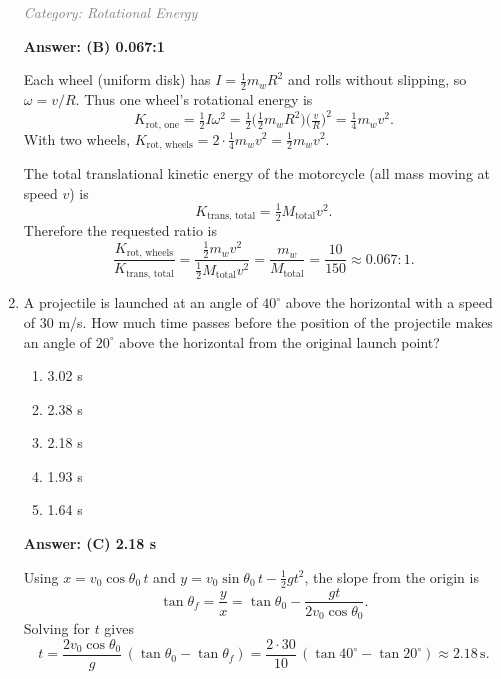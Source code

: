 ﻿\documentclass[12pt, a4paper]{article}
\makeatletter
\newif\if@categoryprinted
\newcommand{\category}[1]{\if@categoryprinted\relax\else\textit{\textcolor{gray}{Category: #1}}\global\@categoryprintedtrue\fi}
\makeatother
\begin{document}
\begin{CJK*}{UTF8}{gbsn}
\begin{enumerate}[itemsep=1.0em, topsep=0.6em]
\category{Rotational Energy}
\begin{solutionbox}
\textbf{Answer: (B) 0.067:1}

Each wheel (uniform disk) has $I=\tfrac{1}{2}m_w R^2$ and rolls without slipping, so $\omega=v/R$. Thus one wheel's rotational energy is
\[
K_{\text{rot, one}}=\tfrac{1}{2}I\omega^2=\tfrac{1}{2}\Big(\tfrac{1}{2}m_w R^2\Big)\Big(\tfrac{v}{R}\Big)^2=\tfrac{1}{4}m_w v^2.
\]
With two wheels, $K_{\text{rot, wheels}}=2\cdot\tfrac{1}{4}m_w v^2=\tfrac{1}{2}m_w v^2$.

The total translational kinetic energy of the motorcycle (all mass moving at speed $v$) is
\[
K_{\text{trans, total}}=\tfrac{1}{2}M_{\text{total}}v^2.
\]
Therefore the requested ratio is
\[
\frac{K_{\text{rot, wheels}}}{K_{\text{trans, total}}}=\frac{\tfrac{1}{2}m_w v^2}{\tfrac{1}{2}M_{\text{total}}v^2}=\frac{m_w}{M_{\text{total}}}=\frac{10}{150}\approx0.067:1.
\]
\end{solutionbox}

\newpage

\item \label{prob:39}
A projectile is launched at an angle of $40^\circ$ above the horizontal with a speed of 30 m/s. How much time passes before the position of the projectile makes an angle of $20^\circ$ above the horizontal from the original launch point?
\begin{enumerate}[label=(\Alph*)]
    \item 3.02 s
    \item 2.38 s
    \item 2.18 s
    \item 1.93 s
    \item 1.64 s
\end{enumerate}

\category{Kinematics}
\begin{solutionbox}
\textbf{Answer: (C) 2.18 s}

Using $x=v_0\cos\theta_0\,t$ and $y=v_0\sin\theta_0\,t-\tfrac12gt^2$, the slope from the origin is
\[
\tan\theta_f=\frac{y}{x}=\tan\theta_0-\frac{g t}{2 v_0\cos\theta_0}.
\]
Solving for $t$ gives
\[
t=\frac{2 v_0 \cos\theta_0}{g}\,(\tan\theta_0-\tan\theta_f)=\frac{2\cdot30}{10}\,(\tan40^\circ-\tan20^\circ)\approx2.18\,\text{s}.
\]
\end{solutionbox}

\end{enumerate}
\end{CJK*}
\end{document}
